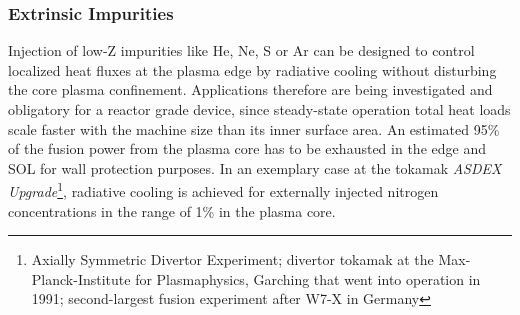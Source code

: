             \subsubsection*{Extrinsic Impurities}%
%
                Injection of low-Z impurities like He, Ne, S or Ar can be designed to control localized heat fluxes at the plasma edge by radiative cooling without disturbing the core plasma confinement. Applications therefore are being investigated and obligatory for a reactor grade device, since steady-state operation total heat loads scale faster with the machine size than its inner surface area. An estimated 95\% of the fusion power from the plasma core has to be exhausted in the edge and SOL for wall protection purposes. In an exemplary case at the tokamak \textit{ASDEX Upgrade}\footnote[1]{Axially Symmetric Divertor Experiment; divertor tokamak at the Max-Planck-Institute for Plasmaphysics, Garching that went into operation in 1991; second-largest fusion experiment after W7-X in Germany}, radiative cooling is achieved for externally injected nitrogen concentrations in the range of 1\% in the plasma core.\cite{Dux1996,Kallenbach2009,Kallenbach2011,Kallenbach2012,Casson2015}\\

